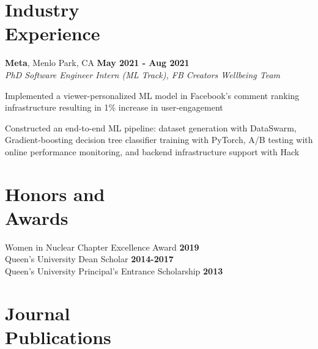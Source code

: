 \documentclass[margin,line]{resume}
\begin{document}
\begin{resume}
    \section{\mysidestyle Industry\\Experience}
    \textbf{Meta}, Menlo Park, CA \hfill \textbf{May 2021 - Aug 2021}\\\vspace{-4mm}%
    \textsl{PhD Software Engineer Intern (ML Track), FB Creators Wellbeing Team}\\
    \begin{list2}
            \item Implemented a viewer-personalized ML model in Facebook's comment 
            ranking infrastructure resulting in 1\% increase in user-engagement
            \item Constructed an end-to-end ML pipeline: dataset generation
            with DataSwarm, Gradient-boosting decision tree classifier
            training with PyTorch, A/B testing with online performance
            monitoring, and backend infrastructure support with Hack
    \end{list2}\vspace{-1.5mm}
    \section{\mysidestyle Honors and\\Awards}
    Women in Nuclear Chapter Excellence Award \hfill \textbf{2019}\vspace{.5mm}\\%
    Queen's University Dean Scholar  \hfill \textbf{2014-2017}\vspace{.5mm}\\
    Queen's University Principal's Entrance Scholarship \hfill \textbf{2013}\hfill 


    \section{\mysidestyle Journal\\Publications}
      \begin{bibenum} 


\end{bibenum}
\end{resume}
\end{document}
